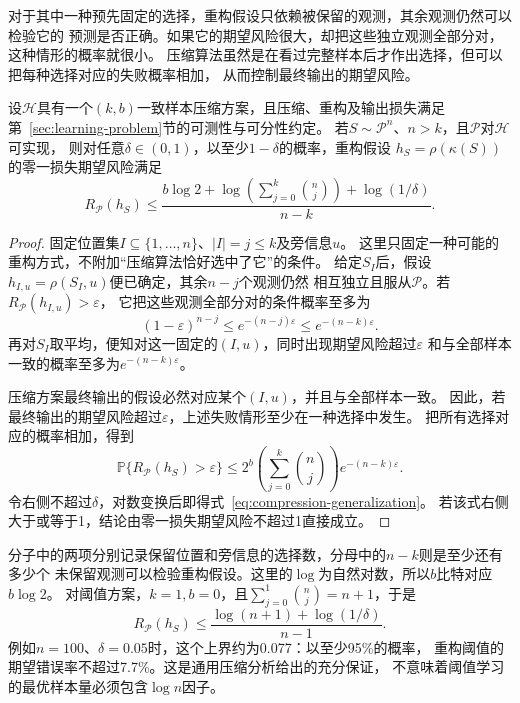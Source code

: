 对于其中一种预先固定的选择，重构假设只依赖被保留的观测，其余观测仍然可以检验它的
预测是否正确。如果它的期望风险很大，却把这些独立观测全部分对，这种情形的概率就很小。
压缩算法虽然是在看过完整样本后才作出选择，但可以把每种选择对应的失败概率相加，
从而控制最终输出的期望风险。

\begin{theorem}[一致样本压缩的期望风险上界]
\label{thm:sample-compression-bound}
设$\mathcal H$具有一个$(k,b)$一致样本压缩方案，且压缩、重构及输出损失满足
第~\ref{sec:learning-problem}节的可测性与可分性约定。
若$S\sim\mathcal P^n$、$n>k$，且$\mathcal P$对$\mathcal H$可实现，
则对任意$\delta\in(0,1)$，以至少$1-\delta$的概率，重构假设
$h_S=\rho(\kappa(S))$的零一损失期望风险满足
\begin{equation}
 R_{\mathcal P}(h_S)
 \leq\frac{b\log2+\log\!\left(\sum_{j=0}^k\binom nj\right)+\log(1/\delta)}{n-k}.
 \label{eq:compression-generalization}
\end{equation}
\end{theorem}

\begin{proof}
固定位置集$I\subseteq\{1,\ldots,n\}$、$|I|=j\leq k$及旁信息$u$。
这里只固定一种可能的重构方式，不附加“压缩算法恰好选中了它”的条件。
给定$S_I$后，假设$h_{I,u}=\rho(S_I,u)$便已确定，其余$n-j$个观测仍然
相互独立且服从$\mathcal P$。若$R_{\mathcal P}(h_{I,u})>\varepsilon$，
它把这些观测全部分对的条件概率至多为
\[
 (1-\varepsilon)^{n-j}\leq e^{-(n-j)\varepsilon}
 \leq e^{-(n-k)\varepsilon}.
\]
再对$S_I$取平均，便知对这一固定的$(I,u)$，同时出现期望风险超过$\varepsilon$
和与全部样本一致的概率至多为$e^{-(n-k)\varepsilon}$。

压缩方案最终输出的假设必然对应某个$(I,u)$，并且与全部样本一致。
因此，若最终输出的期望风险超过$\varepsilon$，上述失败情形至少在一种选择中发生。
把所有选择对应的概率相加，得到
\[
 \mathbb P\{R_{\mathcal P}(h_S)>\varepsilon\}
 \leq 2^b\left(\sum_{j=0}^k\binom nj\right)e^{-(n-k)\varepsilon}.
\]
令右侧不超过$\delta$，对数变换后即得式~\eqref{eq:compression-generalization}。
若该式右侧大于或等于1，结论由零一损失期望风险不超过1直接成立。
\end{proof}

分子中的两项分别记录保留位置和旁信息的选择数，分母中的$n-k$则是至少还有多少个
未保留观测可以检验重构假设。这里的$\log$为自然对数，所以$b$比特对应$b\log2$。
对阈值方案，$k=1,b=0$，且$\sum_{j=0}^1\binom nj=n+1$，于是
\[
 R_{\mathcal P}(h_S)\leq\frac{\log(n+1)+\log(1/\delta)}{n-1}.
\]
例如$n=100$、$\delta=0.05$时，这个上界约为0.077：以至少95\%的概率，
重构阈值的期望错误率不超过7.7\%。这是通用压缩分析给出的充分保证，
不意味着阈值学习的最优样本量必须包含$\log n$因子。

